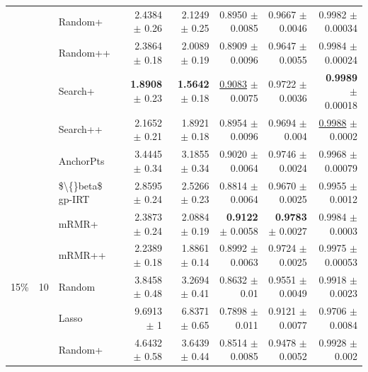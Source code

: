 \begin{longtable}{llp{}rrrrr}
 &  & Random+ & 2.4384 {\scriptsize $\pm$ 0.26} & 2.1249 {\scriptsize $\pm$ 0.25} & 0.8950 {\scriptsize $\pm$ 0.0085} & 0.9667 {\scriptsize $\pm$ 0.0046} & 0.9982 {\scriptsize $\pm$ 0.00034} \\
 &  & Random++ & 2.3864 {\scriptsize $\pm$ 0.18} & 2.0089 {\scriptsize $\pm$ 0.19} & 0.8909 {\scriptsize $\pm$ 0.0096} & 0.9647 {\scriptsize $\pm$ 0.0055} & 0.9984 {\scriptsize $\pm$ 0.00024} \\
 &  & Search+ & \textbf{1.8908} {\scriptsize $\pm$ 0.23} & \textbf{1.5642} {\scriptsize $\pm$ 0.18} & \underline{0.9083} {\scriptsize $\pm$ 0.0075} & 0.9722 {\scriptsize $\pm$ 0.0036} & \textbf{0.9989} {\scriptsize $\pm$ 0.00018} \\
 &  & Search++ & 2.1652 {\scriptsize $\pm$ 0.21} & 1.8921 {\scriptsize $\pm$ 0.18} & 0.8954 {\scriptsize $\pm$ 0.0096} & 0.9694 {\scriptsize $\pm$ 0.004} & \underline{0.9988} {\scriptsize $\pm$ 0.0002} \\
 &  & AnchorPts & 3.4445 {\scriptsize $\pm$ 0.34} & 3.1855 {\scriptsize $\pm$ 0.34} & 0.9020 {\scriptsize $\pm$ 0.0064} & 0.9746 {\scriptsize $\pm$ 0.0024} & 0.9968 {\scriptsize $\pm$ 0.00079} \\
 &  & \$\textbackslash\{\}beta\$ gp-IRT & 2.8595 {\scriptsize $\pm$ 0.24} & 2.5266 {\scriptsize $\pm$ 0.23} & 0.8814 {\scriptsize $\pm$ 0.0064} & 0.9670 {\scriptsize $\pm$ 0.0025} & 0.9955 {\scriptsize $\pm$ 0.0012} \\
 &  & mRMR+ & 2.3873 {\scriptsize $\pm$ 0.24} & 2.0884 {\scriptsize $\pm$ 0.19} & \textbf{0.9122} {\scriptsize $\pm$ 0.0058} & \textbf{0.9783} {\scriptsize $\pm$ 0.0027} & 0.9984 {\scriptsize $\pm$ 0.0003} \\
 &  & mRMR++ & 2.2389 {\scriptsize $\pm$ 0.18} & 1.8861 {\scriptsize $\pm$ 0.14} & 0.8992 {\scriptsize $\pm$ 0.0063} & 0.9724 {\scriptsize $\pm$ 0.0025} & 0.9975 {\scriptsize $\pm$ 0.00053} \\
\midrule
15\% & 10 & Random & 3.8458 {\scriptsize $\pm$ 0.48} & 3.2694 {\scriptsize $\pm$ 0.41} & 0.8632 {\scriptsize $\pm$ 0.01} & 0.9551 {\scriptsize $\pm$ 0.0049} & 0.9918 {\scriptsize $\pm$ 0.0023} \\
 &  & Lasso & 9.6913 {\scriptsize $\pm$ 1} & 6.8371 {\scriptsize $\pm$ 0.65} & 0.7898 {\scriptsize $\pm$ 0.011} & 0.9121 {\scriptsize $\pm$ 0.0077} & 0.9706 {\scriptsize $\pm$ 0.0084} \\
 &  & Random+ & 4.6432 {\scriptsize $\pm$ 0.58} & 3.6439 {\scriptsize $\pm$ 0.44} & 0.8514 {\scriptsize $\pm$ 0.0085} & 0.9478 {\scriptsize $\pm$ 0.0052} & 0.9928 {\scriptsize $\pm$ 0.002} \\

\end{longtable}
